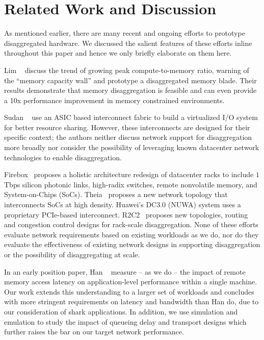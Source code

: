 

\section{Related Work and Discussion}
\label{sec:discussion}


As mentioned earlier, there are many recent and ongoing efforts to prototype disaggregated hardware. We discussed the salient features of these efforts inline throughout this paper and hence we only briefly elaborate on them here. 

Lim \etal~\cite{ddcHwDesign1, ddcHwDesign2} discuss the trend of growing peak compute-to-memory ratio, warning of the ``memory capacity wall'' and prototype a disaggregated memory blade. Their results demonstrate that memory disaggregation is feasible and can even provide a 10x performance improvement in memory constrained environments. 

Sudan \etal~\cite{ddcHwDesign3} use an ASIC based interconnect fabric to build a virtualized I/O system for better resource sharing. However, these interconnects are designed for their specific context; the authors neither discuss network support for disaggregation more broadly nor consider the possibility of leveraging known datacenter network technologies to enable disaggregation.

Firebox~\cite{firebox} proposes a holistic architecture redesign of datacenter racks to include $1$Tbps silicon photonic links, high-radix switches, remote nonvolatile memory, and System-on-Chips (SoCs). Theia~\cite{theia} proposes a new network topology that interconnects SoCs at high density. Huawei's DC3.0 (NUWA) system uses a proprietary PCIe-based interconnect. R2C2~\cite{r2c2} proposes new topologies, routing and congestion control designs for rack-scale disaggregation.
None of these efforts evaluate network requirements based on existing workloads as we do, nor do they evaluate the effectiveness of existing network designs in supporting disaggregation or the possibility of disaggregating at scale.

In an early position paper, Han \etal~\cite{hotnets} measure -- as we do -- the impact of remote memory access latency on application-level performance within a single machine. Our work extends this understanding to a larger set of workloads and concludes with more stringent requirements on latency and bandwidth than Han \etal do, due to our consideration of shark applications. In addition, we use simulation and emulation to study the impact of queueing delay and transport designs which further raises the bar on our target network performance.

